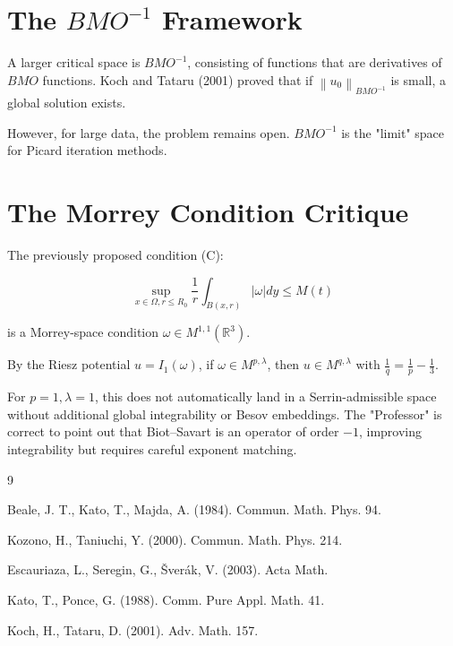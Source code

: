 \documentclass[11pt,a4paper]{amsart}
\newcommand{\norm}[1]{\left\|#1\right\|}
\newcommand{\abs}[1]{\left|#1\right|}
\newcommand{\R}{\mathbb{R}}
\begin{document}
\section{The $BMO^{-1}$ Framework}



A larger critical space is $BMO^{-1}$, consisting of functions that are derivatives of $BMO$ functions. Koch and Tataru (2001) proved that if $\norm{u_0}_{BMO^{-1}}$ is small, a global solution exists.

However, for large data, the problem remains open. $BMO^{-1}$ is the "limit" space for Picard iteration methods.



\section{The Morrey Condition Critique}



The previously proposed condition (C):

\begin{equation}

\sup_{x \in \Omega, r \le R_0} \frac{1}{r} \int_{B(x,r)} \abs{\omega} dy \le M(t)

\end{equation}

is a Morrey-space condition $\omega \in M^{1,1}(\R^3)$. 

By the Riesz potential $u = I_1(\omega)$, if $\omega \in M^{p, \lambda}$, then $u \in M^{q, \lambda}$ with $\frac{1}{q} = \frac{1}{p} - \frac{1}{3}$.

For $p=1, \lambda=1$, this does not automatically land in a Serrin-admissible space without additional global integrability or Besov embeddings. The "Professor" is correct to point out that Biot--Savart is an operator of order $-1$, improving integrability but requires careful exponent matching.



\begin{thebibliography}{9}

 Beale, J. T., Kato, T., Majda, A. (1984). Commun. Math. Phys. 94.

 Kozono, H., Taniuchi, Y. (2000). Commun. Math. Phys. 214.

 Escauriaza, L., Seregin, G., \v{S}ver\'ak, V. (2003). Acta Math.

 Kato, T., Ponce, G. (1988). Comm. Pure Appl. Math. 41.

 Koch, H., Tataru, D. (2001). Adv. Math. 157.

\end{thebibliography}
\end{document}
